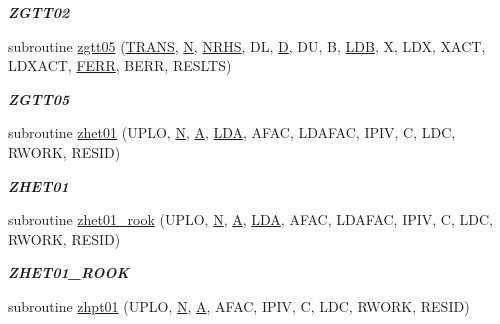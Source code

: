 \begin{DoxyCompactItemize}
\begin{DoxyCompactList}\small\item\em {\bfseries Z\+G\+T\+T02} \end{DoxyCompactList}\item 
subroutine \hyperlink{group__complex16__lin_ga4db56cc9cdd85da19098aedac161c6c3}{zgtt05} (\hyperlink{superlu__enum__consts_8h_a0c4e17b2d5cea33f9991ccc6a6678d62a1f61e3015bfe0f0c2c3fda4c5a0cdf58}{T\+R\+A\+N\+S}, \hyperlink{polmisc_8c_a0240ac851181b84ac374872dc5434ee4}{N}, \hyperlink{example__user_8c_aa0138da002ce2a90360df2f521eb3198}{N\+R\+H\+S}, D\+L, \hyperlink{odrpack_8h_a7dae6ea403d00f3687f24a874e67d139}{D}, D\+U, B, \hyperlink{example__user_8c_a50e90a7104df172b5a89a06c47fcca04}{L\+D\+B}, X, L\+D\+X, X\+A\+C\+T, L\+D\+X\+A\+C\+T, \hyperlink{superlu__enum__consts_8h_af00a42ecad444bbda75cde1b64bd7e72a78fd14d7abebae04095cfbe02928f153}{F\+E\+R\+R}, B\+E\+R\+R, R\+E\+S\+L\+T\+S)
\begin{DoxyCompactList}\small\item\em {\bfseries Z\+G\+T\+T05} \end{DoxyCompactList}\item 
subroutine \hyperlink{group__complex16__lin_ga413921e3029c9feeeb8663929fa873da}{zhet01} (U\+P\+L\+O, \hyperlink{polmisc_8c_a0240ac851181b84ac374872dc5434ee4}{N}, \hyperlink{classA}{A}, \hyperlink{example__user_8c_ae946da542ce0db94dced19b2ecefd1aa}{L\+D\+A}, A\+F\+A\+C, L\+D\+A\+F\+A\+C, I\+P\+I\+V, C, L\+D\+C, R\+W\+O\+R\+K, R\+E\+S\+I\+D)
\begin{DoxyCompactList}\small\item\em {\bfseries Z\+H\+E\+T01} \end{DoxyCompactList}\item 
subroutine \hyperlink{group__complex16__lin_ga04baac26bbc8ee20fd25493ef16268ba}{zhet01\+\_\+rook} (U\+P\+L\+O, \hyperlink{polmisc_8c_a0240ac851181b84ac374872dc5434ee4}{N}, \hyperlink{classA}{A}, \hyperlink{example__user_8c_ae946da542ce0db94dced19b2ecefd1aa}{L\+D\+A}, A\+F\+A\+C, L\+D\+A\+F\+A\+C, I\+P\+I\+V, C, L\+D\+C, R\+W\+O\+R\+K, R\+E\+S\+I\+D)
\begin{DoxyCompactList}\small\item\em {\bfseries Z\+H\+E\+T01\+\_\+\+R\+O\+O\+K} \end{DoxyCompactList}\item 
subroutine \hyperlink{group__complex16__lin_gaaaeb0b6199ae16aeed7e509e038818a1}{zhpt01} (U\+P\+L\+O, \hyperlink{polmisc_8c_a0240ac851181b84ac374872dc5434ee4}{N}, \hyperlink{classA}{A}, A\+F\+A\+C, I\+P\+I\+V, C, L\+D\+C, R\+W\+O\+R\+K, R\+E\+S\+I\+D)

\end{DoxyCompactItemize}
